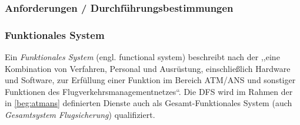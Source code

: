 \subsubsection{Anforderungen / Durchführungsbestimmungen}



\subsubsection{Funktionales System}

Ein \textit{Funktionales System} (engl. functional system) beschreibt nach der  ,,eine Kombination von Verfahren, Personal und Ausrüstung, einschließlich Hardware und Software, zur Erfüllung einer Funktion im Bereich \acs{ATM}/\acs{ANS} und sonstiger Funktionen des Flugverkehrsmanagementnetzes``.
\cite[Anh. I Abs. 56]{2017R0373}
Die \acf{DFS} wird im Rahmen der in \ref{beg:atmans} definierten Dienste auch als Gesamt-Funktionales System (auch \textit{Gesamtsystem Flugsicherung}) qualifiziert.
\cite[17]{ba_technik}


